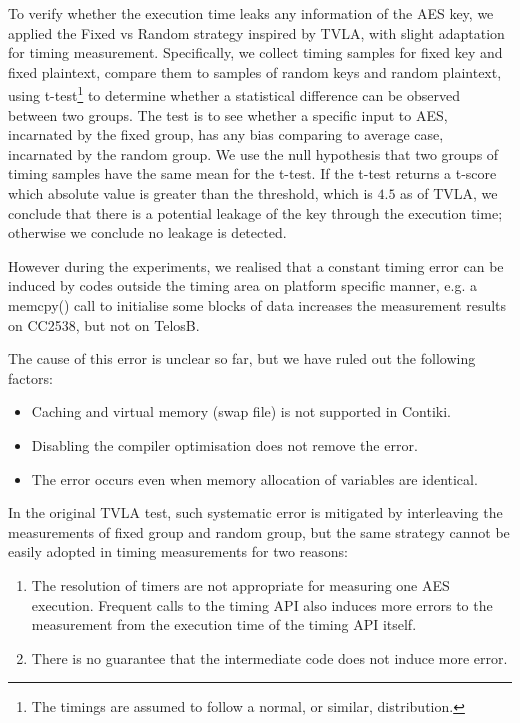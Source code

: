 To verify whether the execution time leaks any information of the AES key, we applied the Fixed vs Random strategy inspired by TVLA\cite{TVLA}, with slight adaptation for timing measurement. Specifically, we collect timing samples for fixed key and fixed plaintext, compare them to samples of random keys and random plaintext, using t-test\footnote{The timings are assumed to follow a normal, or similar, distribution.} to determine whether a statistical difference can be observed  between two groups. The test is to see whether a specific input to AES, incarnated by the fixed group, has any bias comparing to average case, incarnated by the random group. We use the null hypothesis that two groups of timing samples have the same mean for the t-test. If the t-test returns a t-score which absolute value is greater than the threshold, which is $4.5$ as of TVLA, we conclude that there is a potential leakage of the key through the execution time; otherwise we conclude no leakage is detected.

However during the experiments, we realised that a constant timing error can be induced by codes outside the timing area on platform specific manner, e.g. a memcpy() call to initialise some blocks of data increases the measurement results on CC2538, but not on TelosB.

The cause of this error is unclear so far, but we have ruled out the following factors:

\begin{itemize}
	\item Caching and virtual memory (swap file) is not supported in Contiki.
	\item Disabling the compiler optimisation does not remove the error.
	\item The error occurs even when memory allocation of variables are identical.
\end{itemize}

In the original TVLA test, such systematic error is mitigated by interleaving the measurements of fixed group and random group, but the same strategy cannot be easily adopted in timing measurements for two reasons:
\begin{enumerate}
	\item The resolution of timers are not appropriate for measuring one AES execution. Frequent calls to the timing API also induces more errors to the measurement from the execution time of the timing API itself.
	\item There is no guarantee that the intermediate code does not induce more error.
\end{enumerate}

